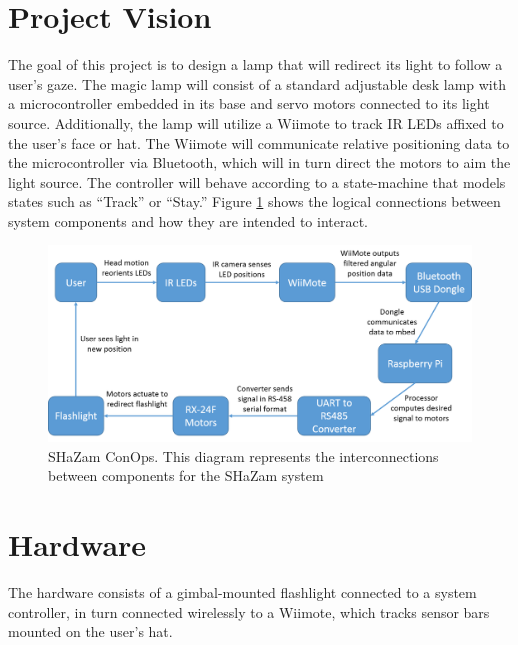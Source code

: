 \documentclass[conference, twocolumn]{IEEEtran}
\begin{document}
\section{Project Vision}

The goal of this project is to design a lamp that will redirect its light to follow a user's gaze. The magic lamp will consist of a standard adjustable desk lamp with a microcontroller embedded in its base and servo motors connected to its light source. Additionally, the lamp will utilize a Wiimote to track IR LEDs affixed to the user's face or hat. The Wiimote will communicate relative positioning data to the microcontroller via Bluetooth, which will in turn direct the motors to aim the light source. The controller will behave according to a state-machine that models states such as ``Track'' or ``Stay.'' Figure \ref{fig:conops} shows the logical connections between system components and how they are intended to interact.

\begin{figure}[!t]
\begin{center}
\includegraphics[width=\linewidth]{../images/conops_update}
\end{center}

\caption{SHaZam ConOps. This diagram represents the interconnections between components for the SHaZam system}
\label{fig:conops}
\end{figure}

\section{Hardware}
\label{sec:hardware}
The hardware consists of a gimbal-mounted flashlight connected to a system controller, in turn connected wirelessly to a Wiimote, which tracks sensor bars mounted on the user's hat.
\end{document}
